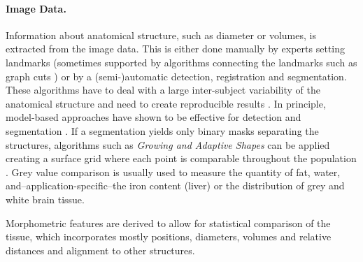 \documentclass[journal]{style/vgtc} 			          %
\begin{document}
\paragraph{Image Data. }
Information about anatomical structure, such as diameter or volumes, is extracted from the image data.
%
This is either done manually by experts setting landmarks (sometimes supported by algorithms connecting the landmarks such as graph cuts \cite{GraphCut}) or by a (semi-)automatic detection, registration and segmentation.
%
These algorithms have to deal with a large inter-subject variability of the anatomical structure and need to create reproducible results \cite{Preim2014}.
%
In principle, model-based approaches have shown to be effective for detection \cite{Rak2013} and segmentation \cite{Gloger2010, Gloger2012}.
%
If a segmentation yields only binary masks separating the structures, algorithms such as \emph{Growing and Adaptive Shapes} can be applied creating a surface grid where each point is comparable throughout the population \cite{Ferrarini2007}.
%
%
Grey value comparison is usually used to measure the quantity of fat, water, and--application-specific--the iron content (liver) or the distribution of grey and white brain tissue.

Morphometric features are derived to allow for statistical comparison of the tissue, which incorporates mostly positions, diameters, volumes and relative distances and alignment to other structures.
% 
\end{document}
